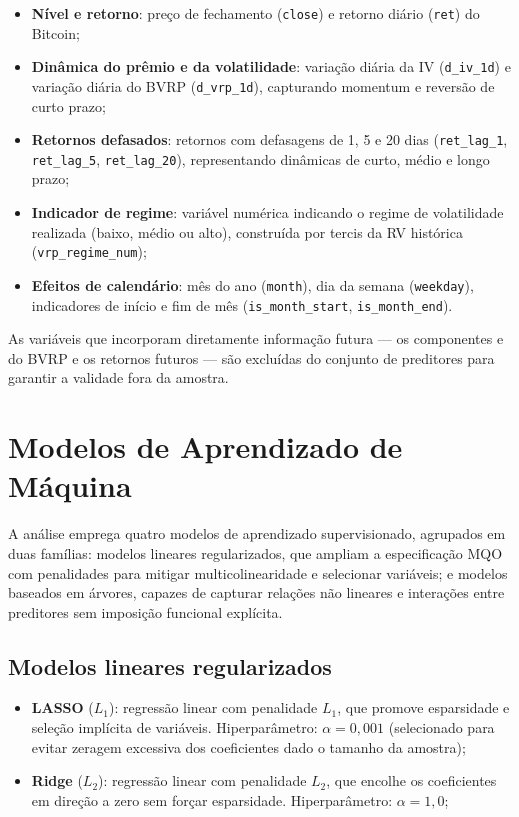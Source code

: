 \begin{itemize}
    \item \textbf{Nível e retorno}: preço de fechamento (\texttt{close}) e retorno
    diário (\texttt{ret}) do Bitcoin;
    \item \textbf{Dinâmica do prêmio e da volatilidade}: variação diária da IV
    (\texttt{d\_iv\_1d}) e variação diária do BVRP (\texttt{d\_vrp\_1d}),
    capturando momentum e reversão de curto prazo;
    \item \textbf{Retornos defasados}: retornos com defasagens de 1, 5 e 20 dias
    (\texttt{ret\_lag\_1}, \texttt{ret\_lag\_5}, \texttt{ret\_lag\_20}),
    representando dinâmicas de curto, médio e longo prazo;
    \item \textbf{Indicador de regime}: variável numérica indicando o regime de
    volatilidade realizada (baixo, médio ou alto), construída por tercis da RV
    histórica (\texttt{vrp\_regime\_num});
    \item \textbf{Efeitos de calendário}: mês do ano (\texttt{month}), dia da semana
    (\texttt{weekday}), indicadores de início e fim de mês (\texttt{is\_month\_start},
    \texttt{is\_month\_end}).
\end{itemize}

As variáveis que incorporam diretamente informação futura ---
os componentes  e  do BVRP e os retornos futuros ---
são excluídas do conjunto de preditores para garantir a validade fora da amostra.

\section{Modelos de Aprendizado de Máquina}
\label{sec:cap8_modelos}

A análise emprega quatro modelos de aprendizado supervisionado, agrupados em duas famílias: modelos lineares regularizados, que ampliam a especificação MQO com penalidades para mitigar multicolinearidade e selecionar variáveis; e modelos baseados em árvores, capazes de capturar relações não lineares e interações entre preditores sem imposição funcional explícita.

\subsection{Modelos lineares regularizados}

\begin{itemize}
    \item \textbf{LASSO} ($L_1$): regressão linear com penalidade $L_1$,
    que promove esparsidade e seleção implícita de variáveis.
    Hiperparâmetro: $\alpha = 0{,}001$ (selecionado para evitar zeragem excessiva dos
    coeficientes dado o tamanho da amostra);
    \item \textbf{Ridge} ($L_2$): regressão linear com penalidade $L_2$,
    que encolhe os coeficientes em direção a zero sem forçar esparsidade.
    Hiperparâmetro: $\alpha = 1{,}0$;
\end{itemize}


